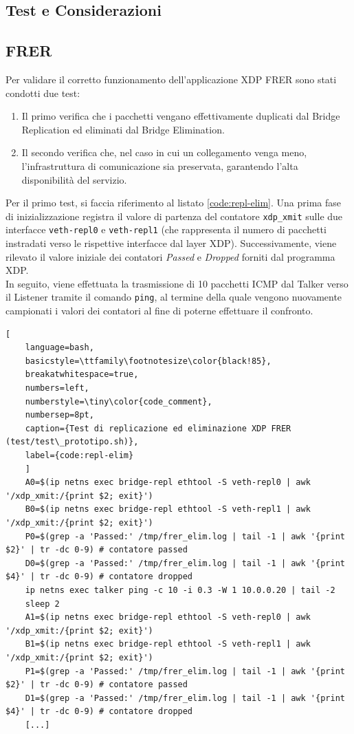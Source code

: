 \documentclass[12pt,a4paper,twoside]{book}
\begin{document}
\begin{onehalfspace}
\section{Test e Considerazioni}
\subsection{FRER}
Per validare il corretto funzionamento dell'applicazione XDP FRER sono stati condotti due test:
\begin{enumerate}
    \item Il primo verifica che i pacchetti vengano effettivamente duplicati dal Bridge Replication ed eliminati dal Bridge Elimination.
    \item Il secondo verifica che, nel caso in cui un collegamento venga meno, l'infrastruttura di comunicazione sia preservata, garantendo l'alta disponibilità del servizio.
\end{enumerate}

Per il primo test, si faccia riferimento al listato \ref{code:repl-elim}. Una prima fase di inizializzazione registra il valore di partenza del contatore \texttt{xdp\_xmit} sulle due interfacce \texttt{veth-repl0} e \texttt{veth-repl1} (che rappresenta il numero di pacchetti instradati verso le rispettive interfacce dal layer XDP). Successivamente, viene rilevato il valore iniziale dei contatori \textit{Passed} e \textit{Dropped} forniti dal programma XDP.
\\ 
In seguito, viene effettuata la trasmissione di 10 pacchetti ICMP dal Talker verso il Listener tramite il comando \texttt{ping}, al termine della quale vengono nuovamente campionati i valori dei contatori al fine di poterne effettuare il confronto.

\begin{lstlisting}[
    language=bash,
    basicstyle=\ttfamily\footnotesize\color{black!85},
    breakatwhitespace=true,
    numbers=left,
    numberstyle=\tiny\color{code_comment},
    numbersep=8pt,
    caption={Test di replicazione ed eliminazione XDP FRER (test/test\_prototipo.sh)},
    label={code:repl-elim}
    ]
    A0=$(ip netns exec bridge-repl ethtool -S veth-repl0 | awk '/xdp_xmit:/{print $2; exit}')
    B0=$(ip netns exec bridge-repl ethtool -S veth-repl1 | awk '/xdp_xmit:/{print $2; exit}')
    P0=$(grep -a 'Passed:' /tmp/frer_elim.log | tail -1 | awk '{print $2}' | tr -dc 0-9) # contatore passed
    D0=$(grep -a 'Passed:' /tmp/frer_elim.log | tail -1 | awk '{print $4}' | tr -dc 0-9) # contatore dropped
    ip netns exec talker ping -c 10 -i 0.3 -W 1 10.0.0.20 | tail -2
    sleep 2
    A1=$(ip netns exec bridge-repl ethtool -S veth-repl0 | awk '/xdp_xmit:/{print $2; exit}')
    B1=$(ip netns exec bridge-repl ethtool -S veth-repl1 | awk '/xdp_xmit:/{print $2; exit}')
    P1=$(grep -a 'Passed:' /tmp/frer_elim.log | tail -1 | awk '{print $2}' | tr -dc 0-9) # contatore passed
    D1=$(grep -a 'Passed:' /tmp/frer_elim.log | tail -1 | awk '{print $4}' | tr -dc 0-9) # contatore dropped
    [...]
\end{lstlisting}


\end{onehalfspace}
\end{document}
